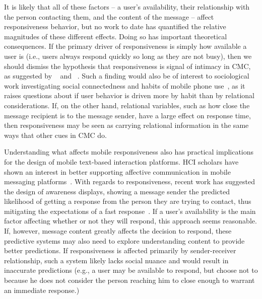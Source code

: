 \documentclass[12pt]{nuthesis}	%
\begin{document}
It is likely that all of these factors -- a user's availability, their relationship with the person contacting them, and the content of the message -- affect responsiveness behavior, but no work to date has quantified the relative magnitudes of these different effects. Doing so has important theoretical consequences. If the primary driver of responsiveness is simply how available a user is (i.e., users always respond quickly so long as they are not busy), then we should dismiss the hypothesis that responsiveness is signal of intimacy in CMC, as suggested by ~\citet{kalman2006pauses} and ~\citet{walther1995nonverbal}. Such a finding would also be of interest to sociological work investigating social connectedness and habits of mobile phone use~\citep[e.g.,][]{bayer2015connection}, as it raises questions about if user behavior is driven more by habit than by relational considerations. If, on the other hand, relational variables, such as how close the message recipient is to the message sender, have a large effect on response time, then responsiveness may be seen as carrying relational information in the same ways that other cues in CMC do.

Understanding what affects mobile responsiveness also has practical implications for the design of mobile text-based interaction platforms. HCI scholars have shown an interest in better supporting affective communication in mobile messaging platforms~\citep[e.g.][]{amin2005sensems}. With regards to responsiveness, recent work has suggested the design of awareness displays, showing a message sender the predicted likelihood of getting a response from the person they are trying to contact, thus mitigating the expectations of a fast response~\citep{pielot2014didn}. If a user's availability is the main factor affecting whether or not they will respond, this approach seems reasonable. If, however, message content greatly affects the decision to respond, these predictive systems may also need to explore understanding content to provide better predictions. If responsiveness is affected primarily by sender-receiver relationship, such a system likely lacks social nuance and would result in inaccurate predictions (e.g., a user may be available to respond, but choose not to because he does not consider the person reaching him to close enough to warrant an immediate response.)
\end{document}

